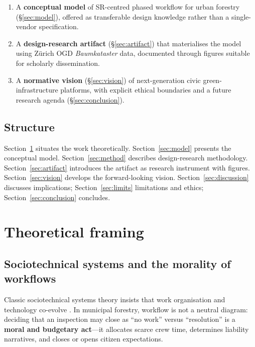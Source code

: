 \documentclass[12pt,a4paper]{article}
\begin{document}
\begin{enumerate}[label=\textbf{C\arabic*:}]
    \item A \textbf{conceptual model} of SR-centred phased workflow for urban forestry (\S\ref{sec:model}), offered as transferable design knowledge rather than a single-vendor specification.
    \item A \textbf{design-research artifact} (\S\ref{sec:artifact}) that materialises the model using Zürich OGD \emph{Baumkataster} data, documented through figures suitable for scholarly dissemination.
    \item A \textbf{normative vision} (\S\ref{sec:vision}) of next-generation civic green-infrastructure platforms, with explicit ethical boundaries and a future research agenda (\S\ref{sec:conclusion}).
\end{enumerate}

\subsection{Structure}

Section~\ref{sec:theory} situates the work theoretically. Section~\ref{sec:model} presents the conceptual model. Section~\ref{sec:method} describes design-research methodology. Section~\ref{sec:artifact} introduces the artifact as research instrument with figures. Section~\ref{sec:vision} develops the forward-looking vision. Section~\ref{sec:discussion} discusses implications; Section~\ref{sec:limits} limitations and ethics; Section~\ref{sec:conclusion} concludes.

\section{Theoretical framing}
\label{sec:theory}

\subsection{Sociotechnical systems and the morality of workflows}

Classic sociotechnical systems theory insists that work organisation and technology co-evolve \cite{trist1981}. In municipal forestry, workflow is not a neutral diagram: deciding that an inspection may close as ``no work'' versus ``resolution'' is a \textbf{moral and budgetary act}---it allocates scarce crew time, determines liability narratives, and closes or opens citizen expectations.
\end{document}
